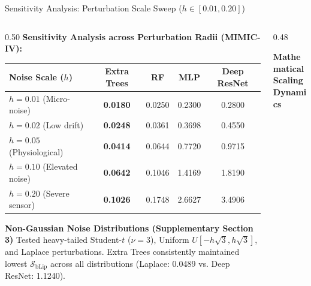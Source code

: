 \documentclass[aspectratio=169,10pt]{beamer}
\begin{document}
\begin{frame}{Sensitivity Analysis: Perturbation Scale Sweep ($h \in [0.01, 0.20]$)}
  \vspace{-0.1cm}
  \begin{columns}[t]
    \begin{column}{0.50\textwidth}
      \textbf{\scriptsize Sensitivity Analysis across Perturbation Radii (MIMIC-IV):}
      \vspace{0.03cm}
      \begin{table}[h]
        \centering
        \setlength{\tabcolsep}{2.5pt}
        \fontsize{6pt}{7.2pt}\selectfont
        \begin{tabular}{lcccc}
          \toprule
          \textbf{Noise Scale ($h$)} & \textbf{Extra Trees} & \textbf{RF} & \textbf{MLP} & \textbf{Deep ResNet} \\
          \midrule
          $h = 0.01$ (Micro-noise) & \textbf{0.0180} & 0.0250 & 0.2300 & 0.2800 \\
          $h = 0.02$ (Low drift) & \textbf{0.0248} & 0.0361 & 0.3698 & 0.4550 \\
          $h = 0.05$ (Physiological) & \textbf{0.0414} & 0.0644 & 0.7720 & 0.9715 \\
          $h = 0.10$ (Elevated noise) & \textbf{0.0642} & 0.1046 & 1.4169 & 1.8190 \\
          $h = 0.20$ (Severe sensor) & \textbf{0.1026} & 0.1748 & 2.6627 & 3.4906 \\
          \bottomrule
        \end{tabular}
      \end{table}
      \vspace{-0.15cm}
      \begin{block}{\textbf{Non-Gaussian Noise Distributions (Supplementary Section 3)}}
        \scriptsize
        Tested heavy-tailed Student-$t$ ($\nu=3$), Uniform $U[-h\sqrt{3}, h\sqrt{3}]$, and Laplace perturbations. Extra Trees consistently maintained lowest $\mathcal{S}_{\text{bLip}}$ across all distributions (Laplace: 0.0489 vs. Deep ResNet: 1.1240).
      \end{block}
    \end{column}
    \begin{column}{0.48\textwidth}
      \begin{exampleblock}{\textbf{Mathematical Scaling Dynamics}}

\end{exampleblock}
\end{column}
\end{columns}
\end{frame}
\end{document}
